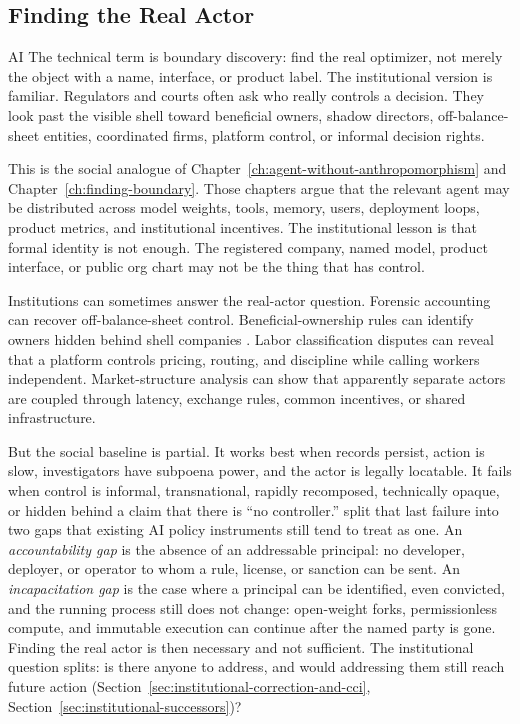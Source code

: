 \begin{refsection}
\authbarneedspace
\section{Finding the Real Actor}
\label{sec:institutional-boundary-discovery}
\begin{authbar}{AI}
The technical term is boundary discovery: find the real optimizer, not merely the object with a name, interface, or product label.
The institutional version is familiar.
Regulators and courts often ask who really controls a decision.
They look past the visible shell toward beneficial owners, shadow directors, off-balance-sheet entities, coordinated firms, platform control, or informal decision rights.

This is the social analogue of Chapter~\ref{ch:agent-without-anthropomorphism} and Chapter~\ref{ch:finding-boundary}.
Those chapters argue that the relevant agent may be distributed across model weights, tools, memory, users, deployment loops, product metrics, and institutional incentives.
The institutional lesson is that formal identity is not enough.
The registered company, named model, product interface, or public org chart may not be the thing that has control.

Institutions can sometimes answer the real-actor question.
Forensic accounting can recover off-balance-sheet control.
Beneficial-ownership rules can identify owners hidden behind shell companies \autocite{fatf2012beneficialownership}.
Labor classification disputes can reveal that a platform controls pricing, routing, and discipline while calling workers independent.
Market-structure analysis can show that apparently separate actors are coupled through latency, exchange rules, common incentives, or shared infrastructure.

But the social baseline is partial.
It works best when records persist, action is slow, investigators have subpoena power, and the actor is legally locatable.
It fails when control is informal, transnational, rapidly recomposed, technically opaque, or hidden behind a claim that there is ``no controller.''
\textcite{hu2026deai} split that last failure into two gaps that existing {AI} policy instruments still tend to treat as one.
An \emph{accountability gap} is the absence of an addressable principal: no developer, deployer, or operator to whom a rule, license, or sanction can be sent.
An \emph{incapacitation gap} is the case where a principal can be identified, even convicted, and the running process still does not change: open-weight forks, permissionless compute, and immutable execution can continue after the named party is gone.
Finding the real actor is then necessary and not sufficient.
The institutional question splits: is there anyone to address, and would addressing them still reach future action (Section~\ref{sec:institutional-correction-and-cci}, Section~\ref{sec:institutional-successors})?


\end{authbar}
\end{refsection}
